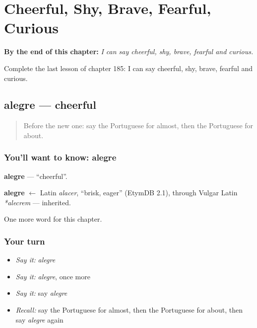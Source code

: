 
\chapter{Cheerful, Shy, Brave, Fearful, Curious}
\label{ch:pt-cheerful-shy-brave-fearful-curious}

\begin{chapteropening}
\textbf{By the end of this chapter:} \emph{I can say cheerful, shy, brave, fearful and curious.}

Complete the last lesson of chapter 185: I can say cheerful, shy, brave, fearful and curious.
\end{chapteropening}

\section[alegre]{alegre — cheerful}

\label{lesson:PT-C185-alegre}



\begin{quote}
Before the new one: say the Portuguese for almost, then the Portuguese for about.
\end{quote}

\subsection*{You'll want to know: alegre}
\textbf{alegre} — \textquotedblleft{}cheerful\textquotedblright{}.

\begin{cousinweb}
\textbf{alegre} $\leftarrow$ Latin \emph{alacer}, \textquotedblleft{}brisk, eager\textquotedblright{} (EtymDB 2.1), through Vulgar Latin \emph{*alecrem} — inherited.
\end{cousinweb}

\begin{grammarlens}[title={What you've built}]
One more word for this chapter.
\end{grammarlens}

\subsection*{Your turn}
\begin{itemize}
\raggedright
  \item \emph{Say it:} \emph{alegre}
  \item \emph{Say it:} \emph{alegre}, once more
  \item \emph{Say it:} say \emph{alegre}
  \item \emph{Recall:} say the Portuguese for almost, then the Portuguese for about, then say \emph{alegre} again
\end{itemize}

